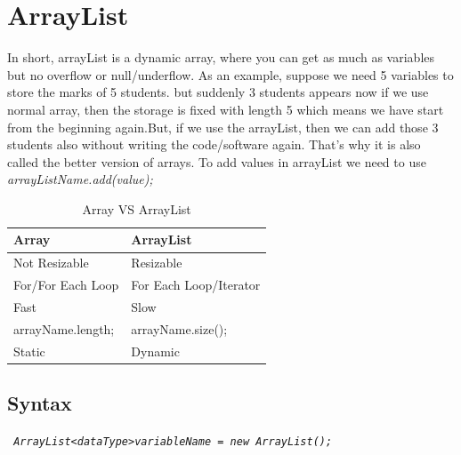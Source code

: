 \documentclass[openany]{book}  %
\begin{document}
\section{ArrayList}
In short, arrayList is a dynamic array, where you can get as
much as variables but no overflow or null/underflow. As an example, suppose we need 5
variables to store the marks of 5 students. but suddenly 3 students appears
now if we use normal array, then the storage is fixed with length 5 which
means we have start from the beginning again.But, if we use the
arrayList, then we can add those 3 students also without writing the
code/software again. That's why it is also called the better version of arrays.\linebreak
To add values in arrayList we need to use \textit{arrayListName.add(value);}
% 
% 
\begin{table}[htbp]
    \begin{tabular}{|l|l|}
        \hline
        Array             & ArrayList              \\ \hline
        Not Resizable     & Resizable              \\ \hline
        For/For Each Loop & For Each Loop/Iterator \\ \hline
        Fast              & Slow                   \\ \hline
        arrayName.length; & arrayName.size();      \\ \hline
        Static            & Dynamic                \\ \hline
    \end{tabular}
    \centering
    \caption{Array VS ArrayList}
\end{table}
% 
% 
\subsection{Syntax}
\begin{center}
    \tt{
        \textit{ArrayList<dataType>variableName = new ArrayList();}
    }
\end{center}
% 
%
\end{document}
